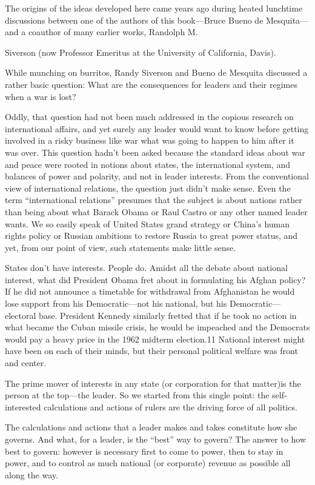 \documentclass[10pt]{article}
\begin{document}
{\large The origins of the ideas developed here came years ago during heated
lunchtime discussions between one of the authors of this book---Bruce Bueno de
Mesquita---and a coauthor of many earlier works, Randolph M.}

{\large Siverson (now Professor Emeritus at the University of California,
Davis).}

{\large While munching on burritos, Randy Siverson and Bueno de Mesquita
discussed a rather basic question: What are the consequences for leaders and
their regimes when a war is lost?}

{\large Oddly, that question had not been much addressed in the copious research
on international affairs, and yet surely any leader would want to know before
getting involved in a risky business like war what was going to happen to him
after it was over. This question hadn't been asked because the standard ideas
about war and peace were rooted in notions about states, the international
system, and balances of power and polarity, and not in leader interests. From the
conventional view of international relations, the question just didn't make
sense. Even the term ``international relations'' presumes that the subject is
about nations rather than being about what Barack Obama or Raul Castro or any
other named leader wants. We so easily speak of United States grand strategy or
China's human rights policy or Russian ambitions to restore Russia to great power
status, and yet, from our point of view, such statements make little sense.}

{\large States don't have interests. People do. Amidst all the debate about
national interest, what did President Obama fret about in formulating his Afghan
policy? If he did not announce a timetable for withdrawal from Afghanistan he
would lose support from his Democratic---not his national, but his
Democratic---electoral base. President Kennedy similarly fretted that if he took
no action in what became the Cuban missile crisis, he would be impeached and the
Democrats would pay a heavy price in the 1962 midterm election.11 National
interest might have been on each of their minds, but their personal political
welfare was front and center.}

{\large The prime mover of interests in any state (or corporation for that
matter)is the person at the top---the leader. So we started from this single
point: the self-interested calculations and actions of rulers are the driving
force of all politics.}

{\large The calculations and actions that a leader makes and takes constitute
how she governs. And what, for a leader, is the ``best'' way to govern? The
answer to how best to govern: however is necessary first to come to power, then
to stay in power, and to control as much national (or corporate) revenue as
possible all along the way.}
\end{document}
